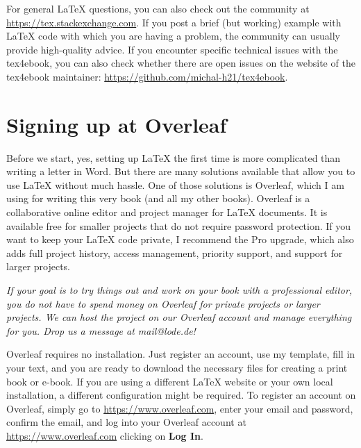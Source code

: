 For general LaTeX questions, you can also check out the community at \url{https://tex.stackexchange.com}. If you post a brief (but working) example with LaTeX code with which you are having a problem, the community can usually provide high-quality advice. If you encounter specific technical issues with the tex4ebook, you can also check whether there are open issues on the website of the tex4ebook maintainer: \url{https://github.com/michal-h21/tex4ebook}.


\section{Signing up at Overleaf}

Before we start, yes, setting up LaTeX the first time is more complicated than writing a letter in Word. But there are many solutions available that allow you to use LaTeX without much hassle. One of those solutions is Overleaf, which I am using for writing this very book (and all my other books). Overleaf is a collaborative online editor and project manager for LaTeX documents. It is available free for smaller projects that do not require password protection. If you want to keep your LaTeX code private, I recommend the Pro upgrade, which also adds full project history, access management, priority support, and support for larger projects. 

\textit{If your goal is to try things out and work on your book with a professional editor, you do not have to spend money on Overleaf for private projects or larger projects. We can host the project on our Overleaf account and manage everything for you. Drop us a message at mail@lode.de!}



Overleaf requires no installation. Just register an account, use my template, fill in your text, and you are ready to download the necessary files for creating a print book or e-book. If you are using a different LaTeX website or your own local installation, a different configuration might be required. To register an account on Overleaf, simply go to \url{https://www.overleaf.com}, enter your email and password, confirm the email, and log into your Overleaf account at \url{https://www.overleaf.com} clicking on \textbf{Log In}.


